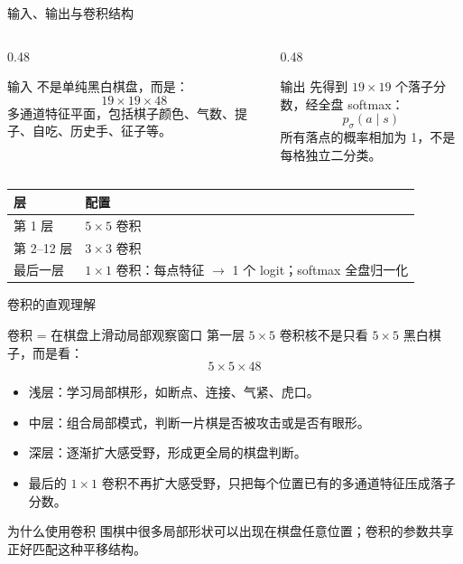\documentclass[UTF8,aspectratio=169,10pt]{ctexbeamer}
\begin{document}
\begin{frame}{输入、输出与卷积结构}
  \small
  \begin{columns}[T,onlytextwidth]
    \begin{column}{0.48\textwidth}
      \begin{block}{输入}
        不是单纯黑白棋盘，而是：
        \[
          19 \times 19 \times 48
        \]
        多通道特征平面，包括棋子颜色、气数、提子、自吃、历史手、征子等。
      \end{block}
    \end{column}
    \begin{column}{0.48\textwidth}
      \begin{block}{输出}
        先得到 $19\times19$ 个落子分数，经全盘 softmax：
        \[
          p_{\sigma}(a\mid s)
        \]
        所有落点的概率相加为 1，不是每格独立二分类。
      \end{block}
    \end{column}
  \end{columns}

  \vspace{0.4cm}
  \begin{center}
    \begin{tabular}{@{}p{}p{}@{}}
      \toprule
      层 & 配置 \\
      \midrule
      第 1 层 & $5\times5$ 卷积 \\
      第 2--12 层 & $3\times3$ 卷积 \\
      最后一层 & $1\times1$ 卷积：每点特征 $\to$ 1 个 logit；softmax 全盘归一化 \\
      \bottomrule
    \end{tabular}
  \end{center}
\end{frame}

\begin{frame}{卷积的直观理解}
  \begin{block}{卷积 = 在棋盘上滑动局部观察窗口}
    第一层 $5\times5$ 卷积核不是只看 $5\times5$ 黑白棋子，而是看：
    \[
      5 \times 5 \times 48
    \]
  \end{block}

  \begin{itemize}
    \item 浅层：学习局部棋形，如断点、连接、气紧、虎口。
    \item 中层：组合局部模式，判断一片棋是否被攻击或是否有眼形。
    \item 深层：逐渐扩大感受野，形成更全局的棋盘判断。
    \item 最后的 $1\times1$ 卷积不再扩大感受野，只把每个位置已有的多通道特征压成落子分数。
  \end{itemize}

  \begin{block}{为什么使用卷积}
    围棋中很多局部形状可以出现在棋盘任意位置；卷积的参数共享正好匹配这种平移结构。
  \end{block}
\end{frame}
\end{document}
